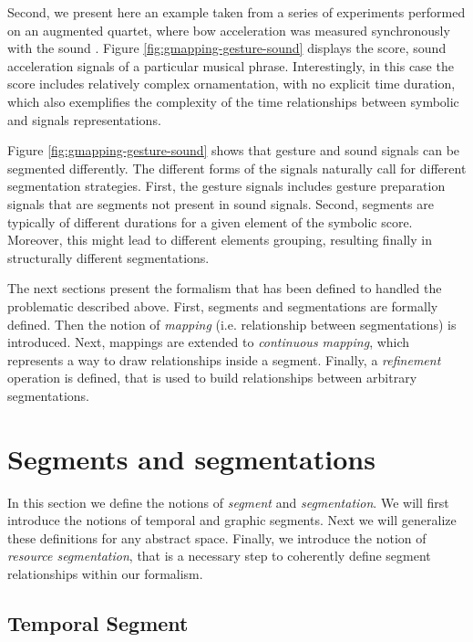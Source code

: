 \documentclass[letterpaper, 12pt]{article}
\begin{document}
Second, we present here an example taken from a series of experiments performed on an augmented quartet, where bow acceleration was measured synchronously with the sound \cite{Bevilacqua_JNMR2012}. Figure \ref{fig:gmapping-gesture-sound} displays the score, sound acceleration signals of a particular musical phrase. Interestingly, in this case the score includes relatively complex ornamentation, with no explicit time duration, which also exemplifies the complexity of the time relationships between symbolic and signals representations.

Figure \ref{fig:gmapping-gesture-sound} shows that gesture and sound signals can be segmented differently. The different forms of the signals naturally call for different segmentation strategies. 
First, the gesture signals includes gesture preparation signals that are segments not present in sound signals. Second, segments are typically of different durations for a given element of the symbolic score. Moreover, this might lead to different elements grouping, resulting finally in structurally different segmentations.

The next sections present the formalism that has been defined to handled the problematic described above. First,
segments and segmentations are formally defined. Then the notion of \emph{mapping} (i.e. relationship between segmentations) is introduced. Next, mappings are extended to \emph{continuous mapping}, which represents a way to draw relationships inside a segment. Finally, a \emph{refinement} operation is defined, that is used to build relationships between arbitrary segmentations.


\section{Segments and segmentations}

In this section we define the notions of \emph{segment} and \emph{ segmentation}. We will first introduce the notions of temporal and graphic segments. Next we will generalize these definitions for any abstract space. Finally, we introduce the notion of \emph{resource segmentation}, that is a necessary step to coherently define segment relationships within our formalism.


\subsection{Temporal Segment}
\end{document}

